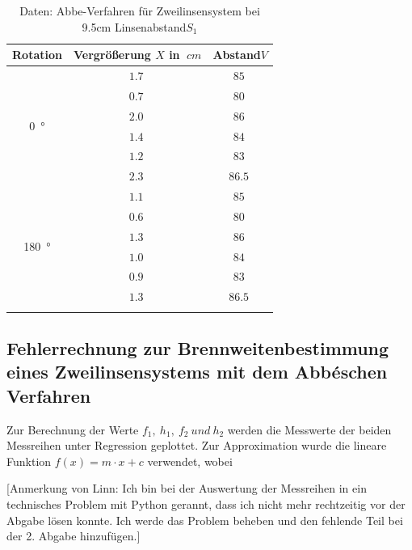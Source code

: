 \begin{table}[h!]
    \begin{center}
        \caption{Daten: Abbe-Verfahren für Zweilinsensystem bei 9.5cm Linsenabstand$S_1$}
        \begin{tabular}{ccc}
            \hline
            Rotation   &  Vergrößerung  $X$ in $\SI{}{cm}$    & Abstand$V$ \\
            \hline
            \multirow{6}{*}{\SI{0}{\degree}}    & $\SI{1.7}{}$ & $\SI{85}{}$ \\
                                                & $\SI{0.7}{}$ & $\SI{80}{}$ \\
                                                & $\SI{2.0}{}$ & $\SI{86}{}$ \\
                                                & $\SI{1.4}{}$ & $\SI{84}{}$ \\
                                                & $\SI{1.2}{}$ & $\SI{83}{}$ \\
                                                & $\SI{2.3}{}$ & $\SI{86.5}{}$ \\
            \hline
            \multirow{6}{*}{\SI{180}{\degree}}  & $\SI{1.1}{}$ & $\SI{85}{}$ \\
                                                & $\SI{0.6}{}$ & $\SI{80}{}$ \\
                                                & $\SI{1.3}{}$ & $\SI{86}{}$ \\
                                                & $\SI{1.0}{}$ & $\SI{84}{}$ \\
                                                & $\SI{0.9}{}$ & $\SI{83}{}$ \\
                                                & $\SI{1.3}{}$ & $\SI{86.5}{}$ \\
            \hline
            \label{tab:Abbe2}
        \end{tabular}
    \end{center}
\end{table}

\clearpage

\subsection{Fehlerrechnung zur Brennweitenbestimmung eines Zweilinsensystems mit dem Abbéschen Verfahren}

Zur Berechnung der Werte $f_1,\ h_1,\ f_2\ und\ h_2$ werden die Messwerte der beiden Messreihen unter Regression geplottet.
Zur Approximation wurde die lineare Funktion $f(x) = m \cdot x + c$ verwendet, wobei 

[Anmerkung von Linn:
Ich bin bei der Auswertung der Messreihen in ein technisches Problem mit Python gerannt, dass ich nicht mehr rechtzeitig vor der Abgabe lösen konnte.
Ich werde das Problem beheben und den fehlende Teil bei der 2. Abgabe hinzufügen.]